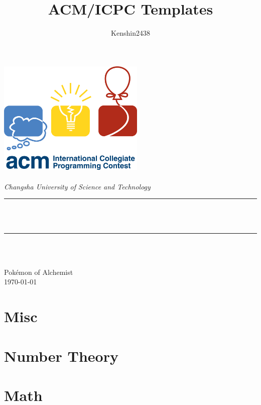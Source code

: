 \documentclass[a4paper,12pt,twoside,fontset=fandol,UTF8]{ctexbook}
\begin{document}
\title{ACM/ICPC Templates}
\author{\textup{Kenshin2438}}

\begin{titlepage}
  \newcommand{\HRule}{\rule{\linewidth}{0.5mm}}
  \centering
  \includegraphics[width=7cm]{icpc.png}\\[1cm]
  \quad\\[1.5cm]
  \textsl{\Large Changsha University of Science and Technology }\\[0.5cm]
  \makeatletter
  \HRule \\[0.4cm]
  { \huge \bfseries \@title }\\[0.4cm]
  \HRule \\[1.5cm]
  \begin{minipage}{0.4\textwidth}
    \centering\large\@author
  \end{minipage}\\[3cm]
  \makeatother
  {\large Pokémon of Alchemist}\\[1cm]
  {\large \today}\\[2cm]
  \vfill
\end{titlepage}
\newpage %
\tableofcontents

\chapter{Misc}
\setcounter{page}{1} %

\chapter{Number Theory}

\chapter{Math}

\end{document}
